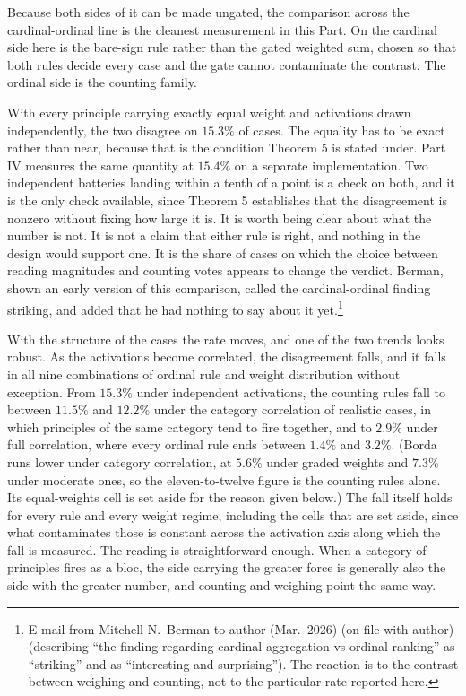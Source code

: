 Because both sides of it can be made ungated, the comparison across the
cardinal-ordinal line is the cleanest measurement in this Part. On the
cardinal side here is the bare-sign rule rather than the gated weighted
sum, chosen so that both rules decide every case and the gate cannot
contaminate the contrast. The ordinal side is the counting family.

With every principle carrying exactly equal weight and activations drawn
independently, the two disagree on $15.3\%$ of cases. The equality has to
be exact rather than near, because that is the condition Theorem 5 is
stated under. Part IV measures the same quantity at $15.4\%$ on a separate implementation.
Two independent batteries landing within a tenth of a point is a check on
both, and it is the only check available, since Theorem 5 establishes that the
disagreement is nonzero without fixing how large it is. It is worth being
clear about what the number is not. It is not a claim that either rule is right, and nothing in the design
would support one. It is the share of cases on which the choice between reading magnitudes and
counting votes appears to change the verdict. Berman, shown an early
version of this comparison, called the cardinal-ordinal finding striking,
and added that he had nothing to say about it yet.\footnote{E-mail from
Mitchell N.\ Berman to author (Mar.\ 2026) (on file with author)
(describing ``the finding regarding cardinal aggregation vs ordinal
ranking'' as ``striking'' and as ``interesting and surprising''). The
reaction is to the contrast between weighing and counting, not to the
particular rate reported here.}

With the structure of the cases the rate moves, and one of the two trends
looks robust. As the activations become correlated, the disagreement falls,
and it falls in all nine combinations of ordinal rule and weight
distribution without exception. From $15.3\%$ under independent
activations, the counting rules fall to between $11.5\%$ and $12.2\%$
under the category correlation of realistic cases, in which principles of
the same category tend to fire together, and to $2.9\%$ under full
correlation, where every ordinal rule ends between $1.4\%$ and $3.2\%$.
(Borda runs lower under category correlation, at $5.6\%$ under graded weights
and $7.3\%$ under moderate ones, so the eleven-to-twelve figure is the
counting rules alone. Its equal-weights cell is set aside for the reason given
below.) The fall itself holds for every rule and every weight regime,
including the cells that are set aside, since what contaminates those is
constant across the activation axis along which the fall is measured. The reading is straightforward enough. When a category of principles fires
as a bloc, the side carrying the greater force is generally also the side
with the greater number, and counting and weighing point the same way.

